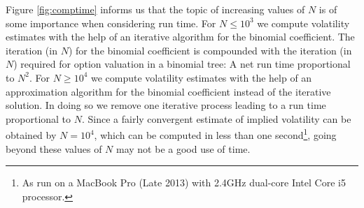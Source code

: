 \documentclass[12pt]{article}
\begin{document}
Figure \ref{fig:comptime} informs us that the topic of increasing values of $N$ is of some importance when considering run time. For $N \leq 10^3$ we compute volatility estimates with the help of an iterative algorithm for the binomial coefficient. The iteration (in $N$) for the binomial coefficient is compounded with the iteration (in $N$) required for option valuation in a binomial tree: A net run time proportional to $N^2$. For $N \geq 10^4$ we compute volatility estimates with the help of an approximation algorithm for the binomial coefficient instead of the iterative solution. In doing so we remove one iterative process leading to a run time proportional to $N$. Since a fairly convergent estimate of implied volatility can be obtained by $N = 10^4$, which can be computed in less than one second\footnote{As run on a MacBook Pro (Late 2013) with 2.4GHz dual-core Intel Core i5 processor.}, going beyond these values of $N$ may not be a good use of time. 
\end{document}
